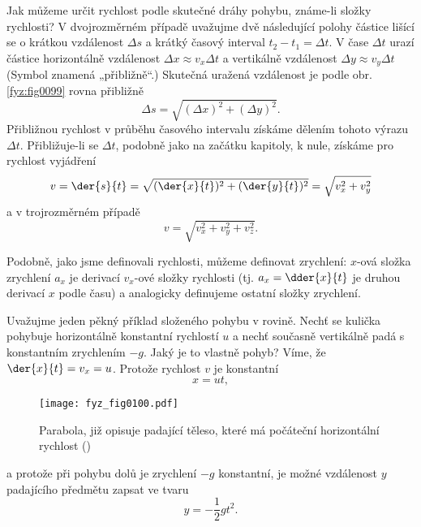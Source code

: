     Jak můžeme určit rychlost podle skutečné dráhy pohybu, známe-li složky rychlosti? V 
    dvojrozměrném případě uvažujme dvě následující polohy částice lišící se o krátkou vzdálenost 
    \(\Delta s\) a krátký časový interval \(t_2- t_1 = \Delta t\). V čase \(\Delta t\) urazí 
    částice horizontálně vzdálenost \(\Delta x \approx  v_x\Delta t\) a vertikálně vzdálenost 
    \(\Delta y \approx  v_y\Delta t\) (Symbol \uv{\(\approx\)} znamená „přibližně“.) Skutečná 
    uražená vzdálenost je podle obr. \ref{fyz:fig0099} rovna přibližně
    \begin{equation}\label{fyz:eq109}
      \Delta s = \sqrt{(\Delta x)^2 + (\Delta y)^2}.
    \end{equation}
    Přibližnou rychlost v průběhu časového intervalu získáme dělením tohoto výrazu \(\Delta t\). 
    Přibližuje-li se \(\Delta t\), podobně jako na začátku kapitoly, k nule, získáme pro rychlost 
    vyjádření
    \begin{equation}\label{fyz:eq110}
      v = \der{s}{t} = \sqrt{(\der{x}{t})^2 + (\der{y}{t})^2} = \sqrt{v_x^2 + v_y^2}
    \end{equation}
    a v trojrozměrném případě
    \begin{equation}\label{fyz:eq097}
      v = \sqrt{v_x^2 + v_y^2 + v_z^2}.
    \end{equation}

    Podobně, jako jsme definovali rychlosti, můžeme definovat zrychlení: \(x\)-ová složka zrychlení 
    \(a_x\) je derivací \(v_x\)-ové složky rychlosti (tj. \(a_x = \dder{x}{t}\) je druhou derivací 
    \(x\) podle času) a analogicky definujeme ostatní složky zrychlení.

    Uvažujme jeden pěkný příklad složeného pohybu v rovině. Nechť se kulička pohybuje horizontálně 
    konstantní rychlostí \(u\) a nechť současně vertikálně padá s konstantním zrychlením \(-g\). 
    Jaký je to vlastně pohyb? Víme, že \(\der{x}{t} = v_x = u\). Protože rychlost \(v\) je 
    konstantní
    \begin{equation}\label{fyz:eq100}
      x = ut,
    \end{equation}

    \begin{figure}[ht!] %
      \centering
      \texttt{[image: fyz\_fig0100.pdf]}
      \caption{Parabola, již opisuje padající těleso, které má počáteční horizontální rychlost
               (\cite[s.~119]{Feynman01})}
      \label{fyz:fig0100}
    \end{figure}
    a protože při pohybu dolů je zrychlení \(-g\) konstantní, je možné vzdálenost \(y\) padajícího 
    předmětu zapsat ve tvaru
    \begin{equation}\label{fyz:eq098}
      y = -\frac{1}{2}gt^2.
    \end{equation}
    
